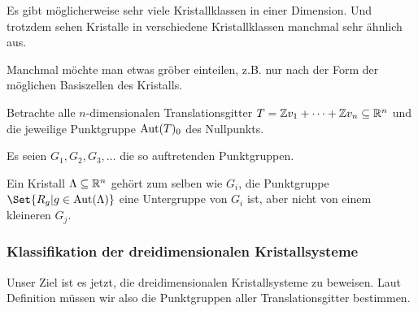 \begin{remark}
Es gibt möglicherweise sehr viele Kristallklassen in einer Dimension. Und trotzdem sehen Kristalle in verschiedene Kristallklassen manchmal sehr ähnlich aus.

Manchmal möchte man etwas gröber einteilen, z.B. nur nach der Form der möglichen Basiszellen des Kristalls.
\end{remark}

\begin{definition}[Kristallsysteme]
Betrachte alle $n$-dimensionalen Translationsgitter $T=\mathbb{Z} v_1+\cdots+\mathbb{Z} v_n\subseteq\mathbb{R}^n$ und die jeweilige Punktgruppe $\operatorname{Aut}(T)_0$ des Nullpunkts.

Es seien $G_1, G_2, G_3, \ldots$ die so auftretenden Punktgruppen.

Ein Kristall $\Lambda\subseteq\mathbb{R}^n$ gehört zum selben  wie $G_i$, die Punktgruppe $\Set{R_g | g\in\Aut(\Lambda)}$ eine Untergruppe von $G_i$ ist, aber nicht von einem kleineren $G_j$.
\end{definition}

\subsubsection{Klassifikation der dreidimensionalen Kristallsysteme}

\begin{remark}
Unser Ziel ist es jetzt, die dreidimensionalen Kristallsysteme zu beweisen. Laut Definition müssen wir also die Punktgruppen aller Translationsgitter bestimmen.
\end{remark}

